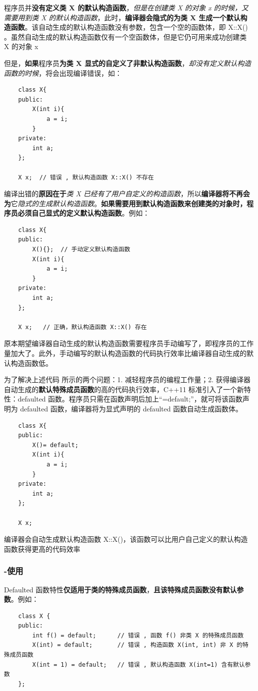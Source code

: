 \documentclass[UTF8,a4paper,12pt]{ctexbook} %
\begin{document}
				程序员并\textbf{没有定义类 X 的默认构造函数}，\textit{但是在创建类 X 的对象 x 的时候，又需要用到类 X 的默认构造函数}，此时，\textbf{编译器会隐式的为类 X 生成一个默认构造函数}。该自动生成的默认构造函数没有参数，包含一个空的函数体，即 X::X(){ }。虽然自动生成的默认构造函数仅有一个空函数体，但是它仍可用来成功创建类 X 的对象 x
				
				但是，\textbf{如果}程序员\textbf{为类 X 显式的自定义了非默认构造函数}，\textit{却没有定义默认构造函数的时候}，将会出现编译错误，如：
					\begin{lstlisting}
	class X{ 
	public: 
		X(int i){ 
			a = i; 
		}     
	private: 
		int a; 
	}; 
	
	X x;  // 错误 , 默认构造函数 X::X() 不存在					
					\end{lstlisting}
				
				编译出错的\textbf{原因在于}\textit{类 X 已经有了用户自定义的构造函数}，所以\textbf{编译器将不再会为}它\textit{隐式的生成默认构造函数}。\textbf{如果需要用到默认构造函数来创建类的对象时，程序员必须自己显式的定义默认构造函数}。例如：
					\begin{lstlisting}
	class X{ 
	public: 
		X(){};  // 手动定义默认构造函数
		X(int i){ 
			a = i; 
		}     
	private: 
		int a; 
	}; 
	
	X x;   // 正确，默认构造函数 X::X() 存在					
					\end{lstlisting}	
					
				原本期望编译器自动生成的默认构造函数需要程序员手动编写了，即程序员的工作量加大了。此外，手动编写的默认构造函数的代码执行效率比编译器自动生成的默认构造函数低。
				
				为了解决上述代码 所示的两个问题：1. 减轻程序员的编程工作量；2. 获得编译器自动生成的\textbf{默认特殊成员函数}的高的代码执行效率，C++11 标准引入了一个新特性：defaulted 函数。程序员只需在函数声明后加上“=default;”，就可将该函数声明为 defaulted 函数，编译器将为显式声明的 defaulted 函数自动生成函数体。
					\begin{lstlisting}
	class X{ 
	public: 
		X()= default; 
		X(int i){ 
			a = i; 
		}     
	private: 
		int a; 
	}; 
	
	X x;						
					\end{lstlisting}
					
					编译器会自动生成默认构造函数 X::X(){}，该函数可以比用户自己定义的默认构造函数获得更高的代码效率
					
			\subsubsection{-使用}
				Defaulted 函数特性\textbf{仅适用于类的特殊成员函数}，\textbf{且该特殊成员函数没有默认参数}。例如：
				\begin{lstlisting}
	class X { 
	public: 
		int f() = default;      // 错误 , 函数 f() 非类 X 的特殊成员函数
		X(int) = default;       // 错误 , 构造函数 X(int, int) 非 X 的特殊成员函数
		X(int = 1) = default;   // 错误 , 默认构造函数 X(int=1) 含有默认参数
	};					
				\end{lstlisting}
				
\end{document}

